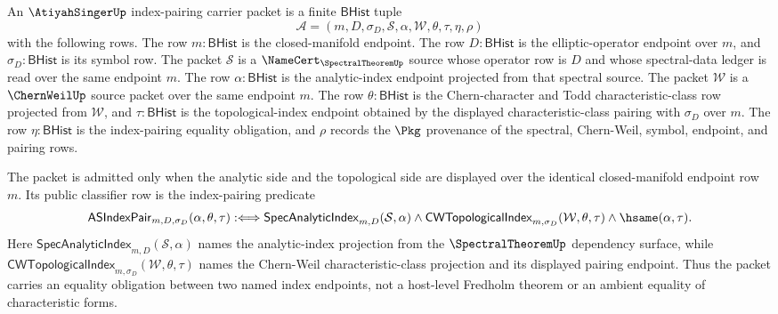 \begin{definition}
\label{def:atiyahsinger-index-pairing-carrier-packet}
An $\AtiyahSingerUp$ index-pairing carrier packet is a finite $\mathsf{BHist}$ tuple
$$
\mathcal{A}=(m,D,\sigma_D,\mathcal{S},\alpha,\mathcal{W},\theta,\tau,\eta,\rho)
$$
with the following rows. The row $m:\mathsf{BHist}$ is the closed-manifold endpoint. The row $D:\mathsf{BHist}$ is the elliptic-operator endpoint over $m$, and $\sigma_D:\mathsf{BHist}$ is its symbol row. The packet $\mathcal{S}$ is a $\NameCert_{\SpectralTheoremUp}$ source whose operator row is $D$ and whose spectral-data ledger is read over the same endpoint $m$. The row $\alpha:\mathsf{BHist}$ is the analytic-index endpoint projected from that spectral source. The packet $\mathcal{W}$ is a $\ChernWeilUp$ source packet over the same endpoint $m$. The row $\theta:\mathsf{BHist}$ is the Chern-character and Todd characteristic-class row projected from $\mathcal{W}$, and $\tau:\mathsf{BHist}$ is the topological-index endpoint obtained by the displayed characteristic-class pairing with $\sigma_D$ over $m$. The row $\eta:\mathsf{BHist}$ is the index-pairing equality obligation, and $\rho$ records the $\Pkg$ provenance of the spectral, Chern-Weil, symbol, endpoint, and pairing rows.

The packet is admitted only when the analytic side and the topological side are displayed over the identical closed-manifold endpoint row $m$. Its public classifier row is the index-pairing predicate
$$
\mathsf{ASIndexPair}_{m,D,\sigma_D}(\alpha,\theta,\tau)
:\Longleftrightarrow
\mathsf{SpecAnalyticIndex}_{m,D}(\mathcal{S},\alpha)\land
\mathsf{CWTopologicalIndex}_{m,\sigma_D}(\mathcal{W},\theta,\tau)\land
\hsame(\alpha,\tau).
$$
Here $\mathsf{SpecAnalyticIndex}_{m,D}(\mathcal{S},\alpha)$ names the analytic-index projection from the $\SpectralTheoremUp$ dependency surface, while $\mathsf{CWTopologicalIndex}_{m,\sigma_D}(\mathcal{W},\theta,\tau)$ names the Chern-Weil characteristic-class projection and its displayed pairing endpoint. Thus the packet carries an equality obligation between two named index endpoints, not a host-level Fredholm theorem or an ambient equality of characteristic forms.
\end{definition}

